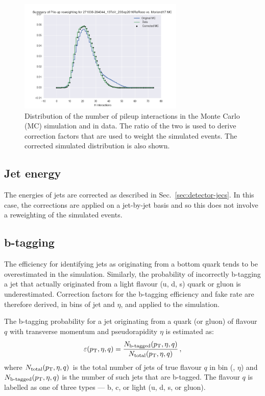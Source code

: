 \begin{figure}[h!]
\centering
\includegraphics[width=0.7\textwidth]{figs/analysis/pileup-weights.pdf}
\caption{Distribution of the number of pileup interactions in the Monte Carlo 
(MC) simulation and in data. The ratio of the two is used to derive correction 
factors that are used to weight the simulated events. The corrected simulated 
distribution is also shown.}
\label{fig:puweights}
\end{figure}

\subsection{Jet energy}
\label{sec:analysis-mccorrections-jec}
The energies of jets are corrected as described in 
Sec.~\ref{sec:detector-jecs}. 
In this case, the corrections are applied on a jet-by-jet basis and so this 
does not involve a reweighting of the simulated events.

\subsection{b-tagging}
\label{sec:analysis-mccorrections-btagging}

The efficiency for identifying jets as originating from a bottom quark tends to 
be overestimated in the simulation. Similarly, the probability of incorrectly 
b-tagging a jet that actually originated from a light flavour (u, d, s) quark 
or gluon is underestimated. Correction factors for the b-tagging efficiency and 
fake rate are therefore derived, in bins of jet \pt and $\eta$, and applied to 
the simulation.

The b-tagging probability 
for a jet originating from a quark (or gluon) of flavour $q$ with transverse 
momentum \pt and pseudorapidity $\eta$ is estimated as:
\begin{equation}
\label{eqn:btag-eff}
\varepsilon({p_{\text T}}, \eta, q) = \frac{N_{\text{b-tagged}}({p_{\text T}}, \eta, 
q)}{N_{\text{total}}({p_{\text T}}, \eta, q)} \, ,
\end{equation}
where $N_{\text{total}}({p_{\text T}}, \eta, q)$ is the total number of jets of true 
flavour $q$ in bin (\pt, $\eta$) and $N_{\text{b-tagged}}({p_{\text T}}, \eta, q)$ is 
the number of such jets that are b-tagged.
The flavour $q$ is labelled as one of three types --- b, c, or light (u, d, 
s, or gluon).

